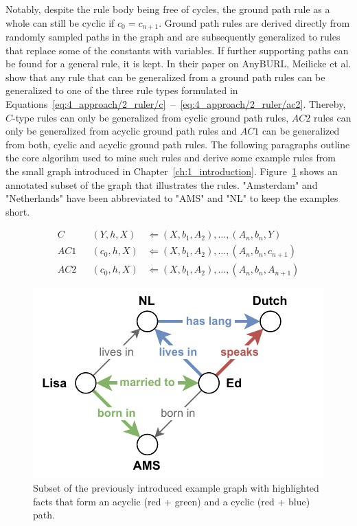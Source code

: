 Notably, despite the rule body being free of cycles, the ground path rule as a whole can still be cyclic if $c_0 = c_{n+1}$. Ground path rules are derived directly from randomly sampled paths in the graph and are subsequently generalized to rules that replace some of the constants with variables. If further supporting paths can be found for a general rule, it is kept. In their paper on AnyBURL, Meilicke et al. show that any rule that can be generalized from a ground path rules can be generalized to one of the three rule types formulated in Equations~\ref{eq:4_approach/2_ruler/c}~--~\ref{eq:4_approach/2_ruler/ac2}. Thereby, $C$-type rules can only be generalized from cyclic ground path rules, $AC2$ rules can only be generalized from acyclic ground path rules and $AC1$ can be generalized from both, cyclic and acyclic ground path rules. The following paragraphs outline the core algorihm used to mine such rules and derive some example rules from the small graph introduced in Chapter~\ref{ch:1_introduction}. Figure~\ref{fig:4_approach/2_ruler/rule_graph} shows an annotated subset of the graph that illustrates the rules. "Amsterdam" and "Netherlands" have been abbreviated to "AMS" and "NL" to keep the examples short.

\begin{align}
    C   && (Y, h, X)   &\Leftarrow (X, b_1, A_2), \dots, (A_n, b_n, Y)
    \label{eq:4_approach/2_ruler/c} \\
    AC1 && (c_0, h, X) &\Leftarrow (X, b_1, A_2), \dots, (A_n, b_n, c_{n+1})
    \label{eq:4_approach/2_ruler/ac1} \\
    AC2 && (c_0, h, X) &\Leftarrow (X, b_1, A_2), \dots, (A_n, b_n, A_{n+1})
    \label{eq:4_approach/2_ruler/ac2}
\end{align}

\begin{figure}[t]
    \centering
    \includegraphics{4_approach/2_ruler/rule_graph}
    \caption{Subset of the previously introduced example graph with highlighted facts that form an acyclic (red + green) and a cyclic (red + blue) path.}
    \label{fig:4_approach/2_ruler/rule_graph}
\end{figure}

